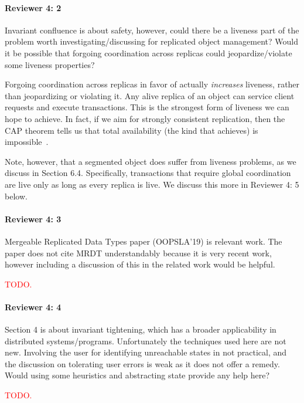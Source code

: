 \documentclass[9pt]{article}
\begin{document}
\begin{multicols*}{2}
\paragraph{Reviewer 4: 2}
\begin{feedback}
  Invariant confluence is about safety, however, could there be a liveness part
  of the problem worth investigating/discussing for replicated object
  management? Would it be possible that forgoing coordination across replicas
  could jeopardize/violate some liveness properties?
\end{feedback}
Forgoing coordination across replicas in favor of \invariantconfluence{}
actually \emph{increases} liveness, rather than jeopardizing or violating it.
Any alive replica of an \invariantconfluent{} object can service client
requests and execute transactions. This is the strongest form of liveness we
can hope to achieve. In fact, if we aim for strongly consistent replication,
then the CAP theorem tells us that total availability (the kind that
\invariantconfluence{} achieves) is impossible~\cite{brewer2012cap,
gilbert2002brewer}.

Note, however, that a segmented \invariantconfluent{} object does suffer from
liveness problems, as we discuss in Section 6.4. Specifically, transactions
that require global coordination are live only as long as every replica is
live. We discuss this more in Reviewer 4: 5 below.

\paragraph{Reviewer 4: 3}
\begin{feedback}
  Mergeable Replicated Data Types paper (OOPSLA'19) is relevant work. The paper
  does not cite MRDT understandably because it is very recent work, however
  including a discussion of this in the related work would be helpful.
\end{feedback}
\textcolor{red}{TODO.}

\paragraph{Reviewer 4: 4}
\begin{feedback}
  Section 4 is about invariant tightening, which has a broader applicability in
  distributed systems/programs. Unfortunately the techniques used here are not
  new. Involving the user for identifying unreachable states in not practical,
  and the discussion on tolerating user errors is weak as it does not offer a
  remedy. Would using some heuristics and abstracting state provide any help
  here?
\end{feedback}
\textcolor{red}{TODO.}


\end{multicols*}
\end{document}
